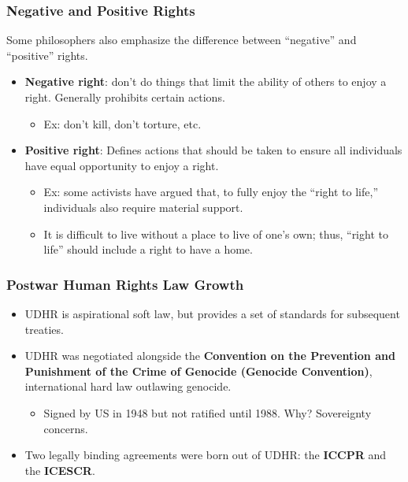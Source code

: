 \documentclass[handout]{beamer}
\begin{document}
\begin{frame} 
	\frametitle{\LARGE{Negative and Positive Rights}}
	Some philosophers also emphasize the difference between ``negative” and ``positive” rights. \pause
	\begin{itemize}
		\item \textbf{Negative right}: don't do things that limit the ability of others to enjoy a right. Generally prohibits certain actions.
		\begin{itemize}
			\item Ex: don't kill, don't torture, etc. \pause
		\end{itemize}
		\item \textbf{Positive right}: Defines actions that should be taken to ensure all individuals have equal opportunity to enjoy a right. \pause
		\begin{itemize}
			\item Ex: some activists have argued that, to fully enjoy the “right to life,” individuals also require material support. 
			\item It is difficult to live without a place to live of one’s own; thus, ``right to life” should include a right to have a home. 
		\end{itemize}
	\end{itemize}
\end{frame}

\begin{frame} 
	\frametitle{\LARGE{Postwar Human Rights Law Growth}}
	\begin{itemize}
		\item UDHR is aspirational soft law, but provides a set of standards for subsequent treaties. \pause
		\item UDHR was negotiated alongside the \textbf{Convention on the Prevention and Punishment of the Crime of Genocide (Genocide Convention)}, international hard law outlawing genocide. \pause
		\begin{itemize}
			\item Signed by US in 1948 but not ratified until 1988. Why? \pause Sovereignty concerns. \pause
		\end{itemize}
		\item Two legally binding agreements were born out of UDHR: the \textbf{ICCPR} and the \textbf{ICESCR}.
	\end{itemize}
\end{frame}
\end{document}

